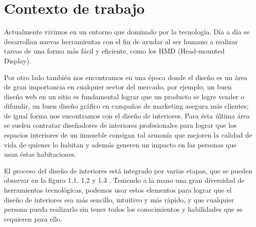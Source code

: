 \section{Contexto de trabajo}

Actualmente vivimos en un entorno que dominado por la tecnología. Día a día se desarrollan nuevas herramientas con el fin de ayudar al ser humano a realizar tareas de una forma más fácil y eficiente, como los HMD (Head-mounted Display)\cite{B15}.


Por otro lado también nos encontramos en una época donde el diseño es un área de gran importancia en cualquier sector del mercado, por ejemplo, un buen diseño web en un sitio es fundamental lograr que un producto se logre vender o difundir, un buen diseño gráfico en campañas de marketing asegura más clientes; de igual forma nos encontramos con el diseño de interiores. Para ésta última área se suelen contratar diseñadores de interiores profesionales para lograr que los espacios interiores de un inmueble consigan tal armonía que mejoren la calidad de vida de quienes lo habitan y además generen un impacto en las personas que usan éstas habitaciones.\par
El proceso del diseño de interiores está integrado por varias etapas, que se pueden observar en la figura 1.1, 1.2 y 1.3	.
Teniendo a la mano una gran diversidad de herramientas tecnológicas, podemos usar estos elementos para lograr que el diseño de interiores sea más sencillo, intuitivo y más rápido, y que cualquier persona pueda realizarlo sin tener todos los conocimientos y habilidades que se requieren para ello.
\newpage

